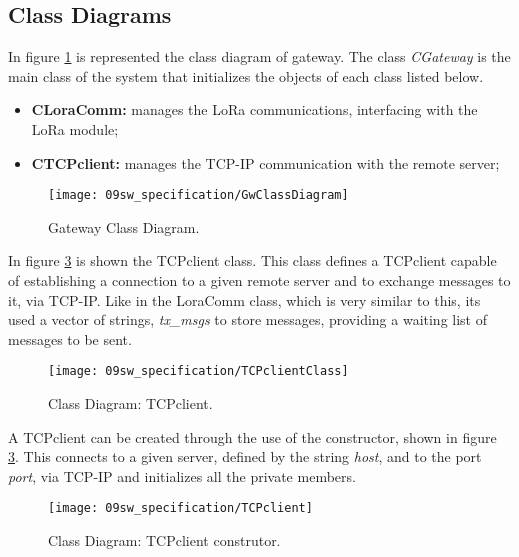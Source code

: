 \subsection{Class Diagrams}
In figure \ref{fig:GwclassDiag} is represented the class diagram of gateway. The class \textit{CGateway} is the main class of the system that initializes the objects of each class listed below.

\begin{itemize}
	\item \textbf{CLoraComm:} manages the LoRa communications, interfacing with the LoRa module;
	
	\item \textbf{CTCPclient:} manages the TCP-IP communication with the remote server;
\end{itemize}

\begin{figure}[H]
	\centering
	\texttt{[image: 09sw\_specification/GwClassDiagram]}
	\caption{Gateway Class Diagram.}
	\label{fig:GwclassDiag}
\end{figure}


In figure \ref{fig:TCPclient} is shown the TCPclient class. This class defines a TCPclient capable of establishing a connection to a given remote server and to exchange messages to it, via TCP-IP. Like in the LoraComm class, which is very similar to this, its used a vector of strings, \textit{tx\_msgs} to store messages, providing a waiting list of messages to be sent.

\begin{figure}[H]
	\centering
	\texttt{[image: 09sw\_specification/TCPclientClass]}
	\caption{Class Diagram: TCPclient.}
	\label{fig:TCPclientClass}
\end{figure}

A TCPclient can be created through the use of the constructor, shown in figure \ref{fig:TCPclient}. This connects to a given server, defined by the string \textit{host}, and to the port \textit{port}, via TCP-IP and initializes all the private members.

\begin{figure}[H]
	\centering
	\texttt{[image: 09sw\_specification/TCPclient]}
	\caption{Class Diagram: TCPclient construtor.}
	\label{fig:TCPclient}
\end{figure}

